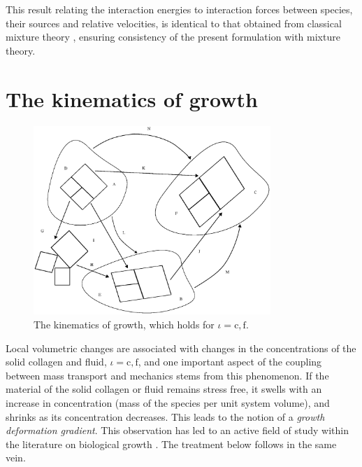 \noindent This result relating the interaction energies to interaction
forces between species, their sources and relative velocities, is
identical to that obtained from classical mixture theory
\citep{TruesdellNoll:65}, ensuring consistency of the present
formulation with mixture theory.

\section{The kinematics of growth}
\label{kinematics-of-growth}

\begin{figure}[ht]
  \centering
  \includegraphics[width=0.8\textwidth]{images/elucidation/kinematics}
  \caption{The kinematics of growth, which holds for $\iota =
    \mathrm{c,f}$.} 
  \label{continuum-potato-growth-kinematics}
\end{figure}

Local volumetric changes are associated with changes in the
concentrations of the solid collagen and fluid, $\iota =
\mathrm{c,f}$, and one important aspect of the coupling between mass
transport and mechanics stems from this phenomenon.  If the material
of the solid collagen or fluid remains stress free, it swells with an
increase in concentration (mass of the species per unit system
volume), and shrinks as its concentration decreases. This leads to the
notion of a \emph{growth deformation gradient}.  This observation has
led to an active field of study within the literature on biological
growth \citep{Skalak:81, SkalakHoger:96, Klischetal:2001,
  TaberHumphrey:2001, LubardaHoger:02, AmbrosiMollica:2002}. The
treatment below follows in the same vein.

